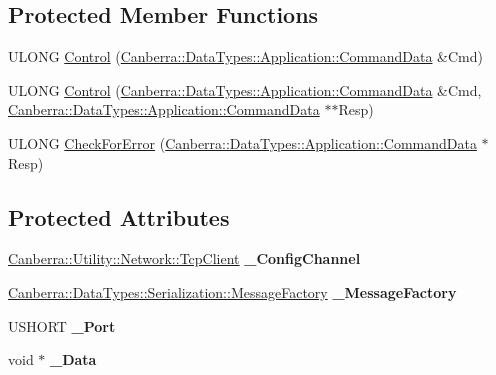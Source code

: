 \subsection*{Protected Member Functions}
\begin{DoxyCompactItemize}
\item 
U\+L\+O\+NG \hyperlink{class_canberra_1_1_protocols_1_1_lynx_1_1_device_ab739d02cc29a9f569a2b127fcbc1f884_ab739d02cc29a9f569a2b127fcbc1f884}{Control} (\hyperlink{class_canberra_1_1_data_types_1_1_application_1_1_command_data}{Canberra\+::\+Data\+Types\+::\+Application\+::\+Command\+Data} \&Cmd)
\item 
U\+L\+O\+NG \hyperlink{class_canberra_1_1_protocols_1_1_lynx_1_1_device_a6232b1dc722fb8f11248e19ddd1f1f47_a6232b1dc722fb8f11248e19ddd1f1f47}{Control} (\hyperlink{class_canberra_1_1_data_types_1_1_application_1_1_command_data}{Canberra\+::\+Data\+Types\+::\+Application\+::\+Command\+Data} \&Cmd, \hyperlink{class_canberra_1_1_data_types_1_1_application_1_1_command_data}{Canberra\+::\+Data\+Types\+::\+Application\+::\+Command\+Data} $\ast$$\ast$Resp)
\item 
U\+L\+O\+NG \hyperlink{class_canberra_1_1_protocols_1_1_lynx_1_1_device_a34ad6cf7b51838a546cb0feef503cc7b_a34ad6cf7b51838a546cb0feef503cc7b}{Check\+For\+Error} (\hyperlink{class_canberra_1_1_data_types_1_1_application_1_1_command_data}{Canberra\+::\+Data\+Types\+::\+Application\+::\+Command\+Data} $\ast$Resp)
\end{DoxyCompactItemize}
\subsection*{Protected Attributes}
\begin{DoxyCompactItemize}
\item 
\mbox{\label{class_canberra_1_1_protocols_1_1_lynx_1_1_device_a4c5133c15a373b01d2b771ce021b0034}} 
\hyperlink{class_canberra_1_1_utility_1_1_network_1_1_tcp_client}{Canberra\+::\+Utility\+::\+Network\+::\+Tcp\+Client} {\bfseries \+\_\+\+Config\+Channel}
\item 
\mbox{\label{class_canberra_1_1_protocols_1_1_lynx_1_1_device_a86d122ea175a5a1ac6706640696e8128}} 
\hyperlink{class_canberra_1_1_data_types_1_1_serialization_1_1_message_factory}{Canberra\+::\+Data\+Types\+::\+Serialization\+::\+Message\+Factory} {\bfseries \+\_\+\+Message\+Factory}
\item 
\mbox{\label{class_canberra_1_1_protocols_1_1_lynx_1_1_device_a481ff0cfb390a41a93dc420945e82880}} 
U\+S\+H\+O\+RT {\bfseries \+\_\+\+Port}
\item 
\mbox{\label{class_canberra_1_1_protocols_1_1_lynx_1_1_device_a78530de2d18211baa2fc9035391b875e}} 
void $\ast$ {\bfseries \+\_\+\+Data}
\end{DoxyCompactItemize}


